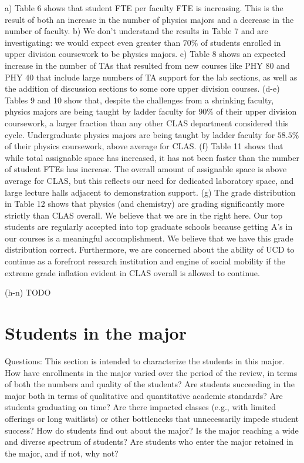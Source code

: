 \documentclass[12pt]{article}
\begin{document}
a) Table 6 shows that student FTE per faculty FTE is increasing.  This is the result of both an increase in the number of physics majors and a decrease in the number of faculty.  
b) {\color{red} We don't understand the results in Table 7 and are investigating: we would expect even greater than $70\%$ of students enrolled in upper division coursework to be physics majors.} 
c) Table 8 shows an expected increase in the number of TAs that resulted from new courses like PHY 80 and PHY 40 that include large numbers of TA support for the lab sections, as well as the addition of discussion sections to some core upper division courses. (d-e) Tables 9 and 10 show that, despite the challenges from a shrinking faculty, physics majors are being taught by ladder faculty for $90\%$ of their upper division coursework, a larger fraction than any other CLAS department considered this cycle.  Undergraduate physics majors are being taught by ladder faculty for $58.5\%$ of their physics coursework, above average for CLAS.  (f) Table 11 shows that while total assignable space has increased, it has not been faster than the number of student FTEs has increase.  The overall amount of assignable space is above average for CLAS, but this reflects our need for dedicated laboratory space, and large lecture halls adjacent to demonstration support. (g) The grade distribution in Table 12 shows that physics (and chemistry) are grading significantly more strictly than CLAS overall.  We believe that we are in the right here.  Our top students are regularly accepted into top graduate schools because getting A's in our courses is a meaningful accomplishment.  We believe that we have this grade distribution correct.  Furthermore, we are concerned about the ability of UCD to continue as a forefront research institution and engine of social mobility if the extreme grade inflation evident in CLAS overall is allowed to continue.  

{\color{red}(h-n) TODO}

\section{Students in the major}
{\color{red} Questions: This section is intended to characterize the students in this major. How have enrollments in the major varied over the period of the review, in terms of both the numbers and quality of the students? Are students succeeding in the major both in terms of qualitative and quantitative academic standards? Are students graduating on time? Are there impacted classes (e.g., with limited offerings or long waitlists) or other bottlenecks that unnecessarily impede student success? How do students find out about the major?  Is the major reaching a wide and diverse spectrum of students? Are students who enter the major retained in the major, and if not, why not?}
\end{document}
